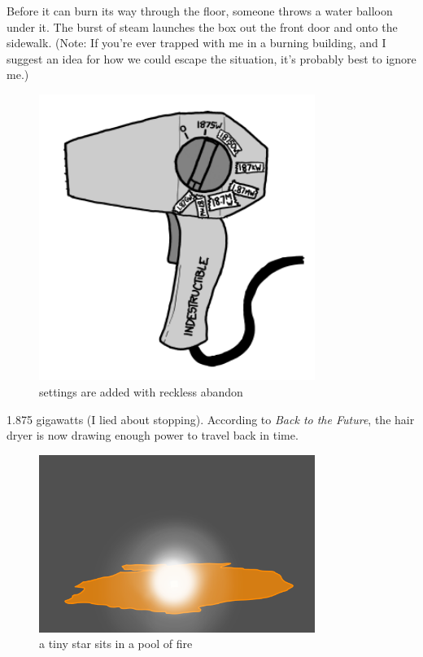 {Before it can burn its way through the floor, someone throws a water balloon under it. The burst of steam launches the box out the front door and onto the sidewalk. (Note: If you’re ever trapped with me in a burning building, and I suggest an idea for how we could escape the situation, it’s probably best to ignore me.)}

\begin{figure}[!htbp]
\centering
\includegraphics[scale=0.5, max width=0.8\textwidth]{imgs/a/35/hair_dryer_1875000000.png}
\caption{settings are added with reckless abandon}
\end{figure}

{1.875 gigawatts (I lied about stopping). According to \emph{Back to the Future}, the hair dryer is now drawing enough power to travel back in time.}

\begin{figure}[!htbp]
\centering
\includegraphics[scale=0.5, max width=0.8\textwidth]{imgs/a/35/hair_dryer_box8000.png}
\caption{a tiny star sits in a pool of fire}
\end{figure}

